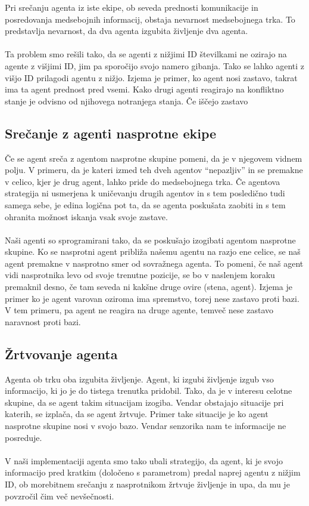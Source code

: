 \documentclass[12pt,a4paper,openany]{book}
\begin{document}
Pri srečanju agenta iz iste ekipe, ob seveda prednosti komunikacije in posredovanja  medsebojnih informacij, 
obstaja nevarnost medsebojnega trka. To predstavlja nevarnost, da dva agenta izgubita življenje dva agenta.\\
\\
Ta problem smo rešili tako, da se agenti z nižjimi ID številkami ne ozirajo na agente z višjimi ID, jim pa 
sporočijo svojo namero gibanja. Tako se lahko agenti z višjo ID prilagodi agentu z nižjo. Izjema je primer, 
ko agent nosi zastavo, takrat ima ta agent prednost pred vsemi. Kako drugi agenti reagirajo na konfliktno 
stanje je odvisno od njihovega notranjega stanja. Če iščejo zastavo 

\subsection{Srečanje z agenti nasprotne ekipe}
Če se agent sreča z agentom nasprotne skupine pomeni, da je v njegovem vidnem polju. V primeru, da je kateri
izmed teh dveh agentov “nepazljiv” in se premakne v celico, kjer je drug agent, lahko pride do medsebojnega 
trka. Če agentova strategija ni usmerjena k uničevanju drugih agentov in s tem posledično tudi samega sebe, 
je edina logična pot ta, da se agenta poskušata zaobiti in s tem ohranita možnost iskanja vsak svoje zastave.\\
\\
Naši agenti so sprogramirani tako, da se poskušajo izogibati agentom nasprotne skupine. Ko se nasprotni
agent približa našemu agentu na razjo ene celice, se naš agent premakne v nasprotno smer od sovražnega agenta.
To pomeni, če naš agent vidi nasprotnika levo od svoje trenutne pozicije, se bo v naslenjem koraku premaknil desno,
če tam seveda ni kakšne druge ovire (stena, agent). Izjema je primer ko je agent varovan oziroma ima spremstvo,
torej nese zastavo proti bazi. V tem primeru, pa agent ne reagira na druge agente, temveč nese zastavo naravnost
proti bazi.


\subsection{Žrtvovanje agenta} 
Agenta ob trku oba izgubita življenje. Agent, ki izgubi življenje izgub vso informacijo, ki jo je do
tistega trenutka pridobil. Tako, da je v interesu celotne skupine, da se agent takim situacijam izogiba.
Vendar obstajajo situacije pri katerih, se izplača, da se agent žrtvuje. Primer take situacije je ko agent
nasprotne skupine nosi v svojo bazo. Vendar senzorika nam te informacije ne posreduje.\\
\\
V naši implementaciji agenta smo tako ubali strategijo, da agent, ki je svojo informacijo pred kratkim
(določeno s parametrom) predal naprej agentu z nižjim ID, ob morebitnem srečanju z nasprotnikom žrtvuje
življenje in upa, da mu je povzročil čim več nevšečnosti.
\newpage



\listoffigures

\listoftables

\newpage
\end{document}

